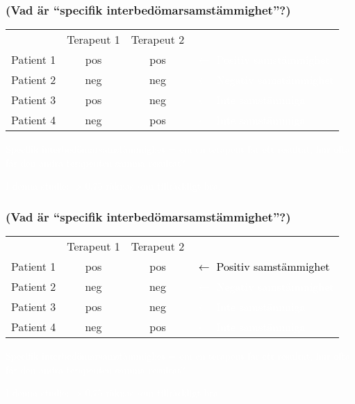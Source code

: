 \documentclass[aspectratio=169,12pt,handout,usenames,dvipsnames]{beamer}
\begin{document}
\begin{frame}
	\frametitle{(Vad är ``specifik interbedömarsamstämmighet''?)}
	{
		\setlength\extrarowheight{2pt}
		\noindent\begin{tabular}{c|ccl}
			& Terapeut 1  & Terapeut 2 & \\
			\cline{1-3}
			Patient 1 & pos & pos & \textcolor{white}{$\leftarrow$ Positiv samstämmighet}\\
			Patient 2 & neg & neg &\textcolor{white}{$\leftarrow$ Negativ samstämmighet}\\
			Patient 3 & pos & neg &\textcolor{white}{$\leftarrow$ Inte samstämmiga}\\
			Patient 4 & neg & pos &\textcolor{white}{$\leftarrow$ Inte samstämmiga}\\
		\end{tabular}
	}\par
	\vspace{2em}
	\par \textcolor{white}{Specifik interbedömarsamstämmighet = om en terapeut får ett resultat, hur ofta får den andra terapeuten samma resultat?}
	\vspace{1em}
	\par \textcolor{white}{I denna studie: $>$0.75 räknas som tillräckligt bra.}
\end{frame}

\begin{frame}
	\frametitle{(Vad är ``specifik interbedömarsamstämmighet''?)}
	{
		\setlength\extrarowheight{2pt}
		\noindent\begin{tabular}{c|ccl}
			& Terapeut 1  & Terapeut 2 & \\
			\cline{1-3}
			Patient 1 & pos & pos & \textcolor{black}{$\leftarrow$ Positiv samstämmighet}\\
			Patient 2 & neg & neg &\textcolor{white}{$\leftarrow$ Negativ samstämmighet}\\
			Patient 3 & pos & neg &\textcolor{white}{$\leftarrow$ Inte samstämmiga}\\
			Patient 4 & neg & pos &\textcolor{white}{$\leftarrow$ Inte samstämmiga}\\
		\end{tabular}
	}\par
	\vspace{2em}
	\par \textcolor{white}{Specifik interbedömarsamstämmighet = om en terapeut får ett resultat, hur ofta får den andra terapeuten samma resultat?}
	\vspace{1em}
	\par \textcolor{white}{I denna studie: $>$0.75 räknas som tillräckligt bra.}
\end{frame}
\end{document}
